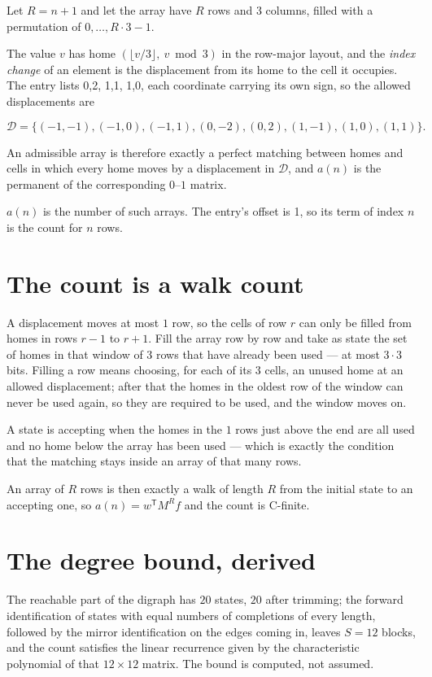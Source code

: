 \documentclass[11pt]{article}
\theoremstyle{definition}
\begin{document}
Let $R = n + 1$ and let the array have $R$ rows and $3$ columns, filled with a permutation of $0,\dots,R\cdot3-1$.

The value $v$ has home $(\lfloor v/3\rfloor,\ v \bmod 3)$ in the row-major layout, and the {\itshape index change} of an element is the displacement from its home to the cell it occupies. The entry lists 0,2, 1,1, 1,0, each coordinate carrying its own sign, so the allowed displacements are

\[\mathcal{D} = \{(-1,-1), (-1,0), (-1,1), (0,-2), (0,2), (1,-1), (1,0), (1,1)\}.\]

An admissible array is therefore exactly a perfect matching between homes and cells in which every home moves by a displacement in $\mathcal{D}$, and $a(n)$ is the permanent of the corresponding $0$--$1$ matrix.

$a(n)$ is the number of such arrays. The entry's offset is 1, so its term of index $n$ is the count for $n$ rows.

\section{The count is a walk count}

A displacement moves at most $1$ row, so the cells of row $r$ can only be filled from homes in rows $r-1$ to $r+1$. Fill the array row by row and take as state the set of homes in that window of $3$ rows that have already been used --- at most $3\cdot3$ bits. Filling a row means choosing, for each of its $3$ cells, an unused home at an allowed displacement; after that the homes in the oldest row of the window can never be used again, so they are required to be used, and the window moves on.

A state is accepting when the homes in the $1$ rows just above the end are all used and no home below the array has been used --- which is exactly the condition that the matching stays inside an array of that many rows.

An array of $R$ rows is then exactly a walk of length $R$ from the initial state to an accepting one, so $a(n) = w^{\mathsf T}M^{R}f$ and the count is C-finite.

\section{The degree bound, derived}

The reachable part of the digraph has $20$ states, $20$ after trimming; the forward identification of states with equal numbers of completions of every length, followed by the mirror identification on the edges coming in, leaves $S = 12$ blocks, and the count satisfies the linear recurrence given by the characteristic polynomial of that $12\times12$ matrix. The bound is computed, not assumed.
\end{document}
